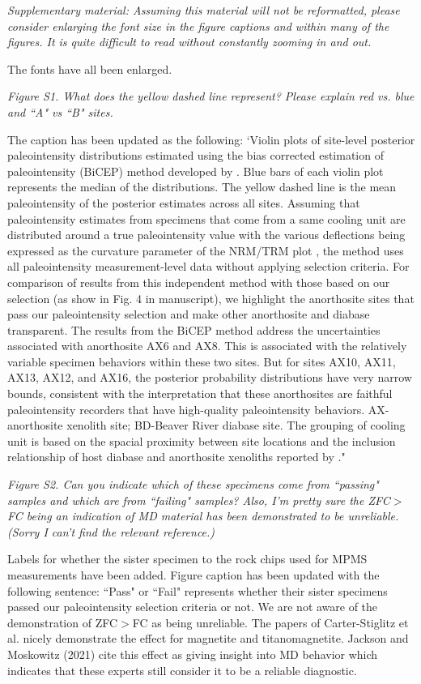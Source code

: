 \documentclass[11pt, letterpaper]{article}
\begin{document}
\begin{flushleft}
\textit{Supplementary material: Assuming this material will not be reformatted, please consider enlarging the font size in the figure captions and within many of the figures. It is quite difficult to read without constantly zooming in and out.}

The fonts have all been enlarged.

\textit{Figure S1. What does the yellow dashed line represent? Please explain red vs. blue and ``A" vs ``B" sites.}

The caption has been updated as the following: `Violin plots of site-level posterior paleointensity distributions estimated using the bias corrected estimation of paleointensity (BiCEP) method developed by \citealp{Cych2021a}. Blue bars of each violin plot represents the median of the distributions. The yellow dashed line is the mean paleointensity of the posterior estimates across all sites. Assuming that paleointensity estimates from specimens that come from a same cooling unit are distributed around a true paleointensity value with the various deflections being expressed as the curvature parameter of the NRM/TRM plot \cite{Arai1963a, Paterson2011a}, the method uses all paleointensity measurement-level data without applying selection criteria. For comparison of results from this independent method with those based on our selection (as show in Fig. 4 in manuscript), we highlight the anorthosite sites that pass our paleointensity selection and make other anorthosite and diabase transparent. The results from the BiCEP method address the uncertainties associated with anorthosite AX6 and AX8. This is associated with the relatively variable specimen behaviors within these two sites. But for sites AX10, AX11, AX13, AX12, and AX16, the posterior probability distributions have very narrow bounds, consistent with the interpretation that these anorthosites are faithful paleointensity recorders that have high-quality paleointensity behaviors. AX-anorthosite xenolith site; BD-Beaver River diabase site. The grouping of cooling unit is based on the spacial proximity between site locations and the inclusion relationship of host diabase and anorthosite xenoliths reported by \citealp{Zhang2021b}."

\textit{Figure S2. Can you indicate which of these specimens come from ``passing" samples and which are from ``failing" samples? Also, I'm pretty sure the ZFC$>$FC being an indication of MD material has been demonstrated to be unreliable. (Sorry I can't find the relevant reference.)}

Labels for whether the sister specimen to the rock chips used for MPMS measurements have been added. Figure caption has been updated with the following sentence: ``Pass" or ``Fail" represents whether their sister specimens passed our paleointensity selection criteria or not. We are not aware of the demonstration of ZFC$>$FC as being unreliable. The papers of Carter-Stiglitz et al. nicely demonstrate the effect for magnetite and titanomagnetite. Jackson and Moskowitz (2021) cite this effect as giving insight into MD behavior which indicates that these experts still consider it to be a reliable diagnostic.  


\end{flushleft}
\end{document}
